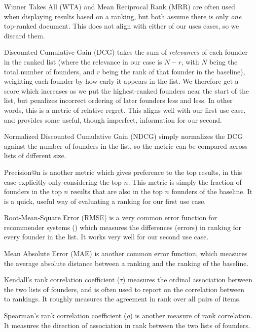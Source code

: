 Winner Takes All (WTA) and Mean Reciprocal Rank (MRR) are often used when displaying results based on a ranking, but both assume there is only \textit{one} top-ranked document. This does not align with either of our uses cases, so we discard them.

Discounted Cumulative Gain (DCG) takes the sum of \textit{relevances} of each founder in the ranked list (where the relevance in our case is $N - r$, with $N$ being the total number of founders, and $r$ being the rank of that founder in the baseline), weighting each founder by how early it appears in the list. We therefore get a score which increases as we put the highest-ranked founders near the start of the list, but penalizes incorrect ordering of later founders less and less. In other words, this is a metric of relative regret. This aligns well with our first use case, and provides some useful, though imperfect, information for our second.

Normalized Discounted Cumulative Gain (NDCG) simply normalizes the DCG against the number of founders in the list, so the metric can be compared across lists of different size.

Precision@n is another metric which gives preference to the top results, in this case explicitly only considering the top $n$. This metric is simply the fraction of founders in the top $n$ results that are also in the top $n$ founders of the baseline. It is a quick, useful way of evaluating a ranking for our first use case.

Root-Mean-Square Error (RMSE) is a very common error function for recommender systems (\cite{Cremonesi:2010:PRA:1864708.1864721}) which measures the differences (errors) in ranking for every founder in the list. It works very well for our second use case.

Mean Absolute Error (MAE) is another common error function, which measures the average absolute distance between a ranking and the ranking of the baseline.

Kendall's rank correlation coefficient ($\tau$) measures the ordinal association between the two lists of founders, and is often used to report on the correlation between to rankings. It roughly measures the agreement in rank over all pairs of items.

Spearman's rank correlation coefficient ($\rho$) is another measure of rank correlation. It measures the direction of association in rank between the two lists of founders.

